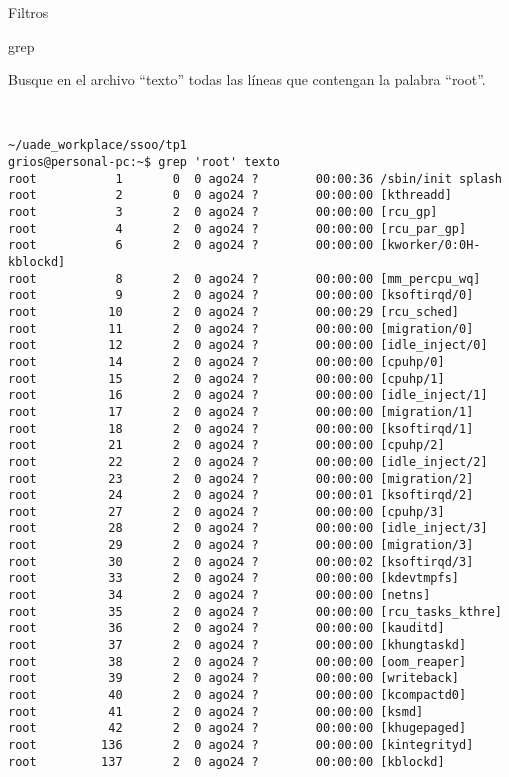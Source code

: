 \begin{section}{Filtros}
\begin{subsection}{grep}
\begin{quoting}
Busque en el archivo “texto” todas las líneas que contengan la palabra “root”.
\end{quoting}\\
\begin{lstlisting}[style=Ubuntu]
~/uade_workplace/ssoo/tp1
grios@personal-pc:~$ grep 'root' texto
root           1       0  0 ago24 ?        00:00:36 /sbin/init splash
root           2       0  0 ago24 ?        00:00:00 [kthreadd]
root           3       2  0 ago24 ?        00:00:00 [rcu_gp]
root           4       2  0 ago24 ?        00:00:00 [rcu_par_gp]
root           6       2  0 ago24 ?        00:00:00 [kworker/0:0H-kblockd]
root           8       2  0 ago24 ?        00:00:00 [mm_percpu_wq]
root           9       2  0 ago24 ?        00:00:00 [ksoftirqd/0]
root          10       2  0 ago24 ?        00:00:29 [rcu_sched]
root          11       2  0 ago24 ?        00:00:00 [migration/0]
root          12       2  0 ago24 ?        00:00:00 [idle_inject/0]
root          14       2  0 ago24 ?        00:00:00 [cpuhp/0]
root          15       2  0 ago24 ?        00:00:00 [cpuhp/1]
root          16       2  0 ago24 ?        00:00:00 [idle_inject/1]
root          17       2  0 ago24 ?        00:00:00 [migration/1]
root          18       2  0 ago24 ?        00:00:00 [ksoftirqd/1]
root          21       2  0 ago24 ?        00:00:00 [cpuhp/2]
root          22       2  0 ago24 ?        00:00:00 [idle_inject/2]
root          23       2  0 ago24 ?        00:00:00 [migration/2]
root          24       2  0 ago24 ?        00:00:01 [ksoftirqd/2]
root          27       2  0 ago24 ?        00:00:00 [cpuhp/3]
root          28       2  0 ago24 ?        00:00:00 [idle_inject/3]
root          29       2  0 ago24 ?        00:00:00 [migration/3]
root          30       2  0 ago24 ?        00:00:02 [ksoftirqd/3]
root          33       2  0 ago24 ?        00:00:00 [kdevtmpfs]
root          34       2  0 ago24 ?        00:00:00 [netns]
root          35       2  0 ago24 ?        00:00:00 [rcu_tasks_kthre]
root          36       2  0 ago24 ?        00:00:00 [kauditd]
root          37       2  0 ago24 ?        00:00:00 [khungtaskd]
root          38       2  0 ago24 ?        00:00:00 [oom_reaper]
root          39       2  0 ago24 ?        00:00:00 [writeback]
root          40       2  0 ago24 ?        00:00:00 [kcompactd0]
root          41       2  0 ago24 ?        00:00:00 [ksmd]
root          42       2  0 ago24 ?        00:00:00 [khugepaged]
root         136       2  0 ago24 ?        00:00:00 [kintegrityd]
root         137       2  0 ago24 ?        00:00:00 [kblockd]

\end{lstlisting}
\end{subsection}
\end{section}
